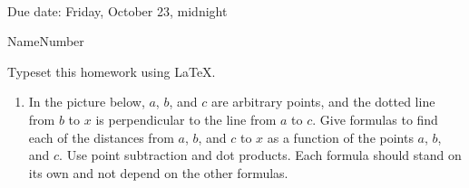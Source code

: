\documentclass{article}
\begin{document}
\\Due date:  Friday, October 23, midnight
\bigskip

\noindent Name\hrulefill Number \hrulefill

Typeset this homework using \LaTeX.

\begin{enumerate}

\item
  In the picture below, $a$, $b$, and $c$ are arbitrary points, and
  the dotted line from $b$ to $x$ is perpendicular to the line from
  $a$ to $c$.  Give formulas to find each of the
  distances from 
  $a$, $b$, and $c$ to $x$ as a function of the points $a$, $b$, and $c$.
  Use point subtraction and dot products.  Each formula should stand
  on its own and not depend on the other formulas.

\newcommand{\mypoint}[3] {
  \node (#1) at (#2) {};
  \fill (#2) circle (2pt);
  \node[anchor=#3] (label#1) at (#2) {$#1$};
  }



\newpage


\end{enumerate}
\end{document}
